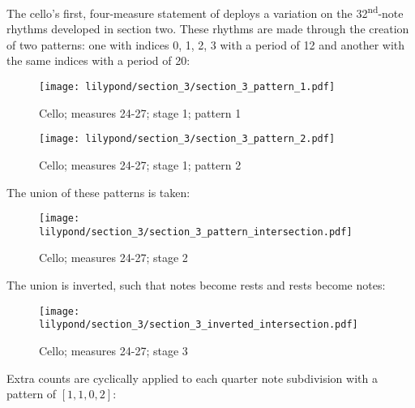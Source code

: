 The cello's first, four-measure statement of  deploys a variation on the 32\textsuperscript{nd}-note rhythms developed in section two. These rhythms are made through the creation of two patterns: one with indices 0, 1, 2, 3 with a period of 12 and another with the same indices with a period of 20:

\setcounter{figure}{20}
\setcounter{subFigure}{1}
\renewcommand{\thefigure}{\thechapter.\arabic{figure}.\alph{subFigure}}
\begin{figure}[H]
    \texttt{[image: lilypond/section\_3/section\_3\_pattern\_1.pdf]}
    \caption{Cello; measures 24-27; stage 1; pattern 1}
    \label{fig:section-3-pattern-1}
\end{figure}

\setcounter{figure}{20}
\setcounter{subFigure}{2}
\begin{figure}[H]
    \texttt{[image: lilypond/section\_3/section\_3\_pattern\_2.pdf]}
    \caption{Cello; measures 24-27; stage 1; pattern 2}
    \label{fig:section-3-pattern-2}
\end{figure}

The union of these patterns is taken:

\setcounter{figure}{20}
\setcounter{subFigure}{3}
\begin{figure}[H]
    \texttt{[image: lilypond/section\_3/section\_3\_pattern\_intersection.pdf]}
    \caption{Cello; measures 24-27; stage 2}
    \label{fig:section-3-pattern-intersection}
\end{figure}

The union is inverted, such that notes become rests and rests become notes:

\setcounter{figure}{20}
\setcounter{subFigure}{4}
\begin{figure}[H]
    \texttt{[image: lilypond/section\_3/section\_3\_inverted\_intersection.pdf]}
    \caption{Cello; measures 24-27; stage 3}
    \label{fig:section-3-inverted-intersection}
\end{figure}

Extra counts are cyclically applied to each quarter note subdivision with a pattern of $[1, 1, 0, 2]$:


